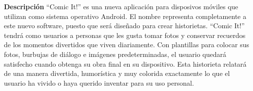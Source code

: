 \documentclass[12pt]{report}
\begin{document}
	\vspace{7mm}

\newpage

	\begingroup
		\large{
			\textbf{
				Descripción
				\newline
				\newline
			}
		}
	\endgroup
``Comic It!'' es una nueva aplicación para disposivos móviles que utilizan como sistema operativo Android. El nombre representa completamente a este nuevo software, puesto que será diseñado para crear historietas. ``Comic It!'' tendrá como usuarios a personas que les gusta tomar fotos y conservar recuerdos de los momentos divertidos que viven diariamente.
\newline
\newline
Con plantillas para colocar sus fotos, burbujas de diálogo e imágenes predeterminadas, el usuario quedará satisfecho cuando obtenga su obra final en su dispositivo. Esta historieta relatará de una manera divertida, humorística y muy colorida exactamente lo que el usuario ha vivido o haya querido inventar para su uso personal.
	\newline
	\newline
	\newline
	\newline
\end{document}
